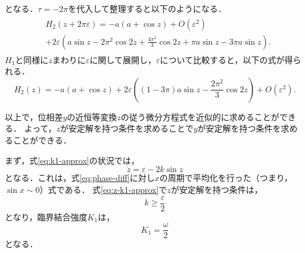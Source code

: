 \documentclass[../main]{subfiles}
\begin{document}
    となる．$\tau=-2\pi$を代入して整理すると以下のようになる．
    \begin{align}
        \begin{split}
            &H_2(z+2\pi\varepsilon )=-a(a+\cos z)+O(\varepsilon^2)\\
            &+2\varepsilon\left( a\sin z-2\pi^2\cos2 z+\frac{4\pi^2}{3} \cos 2 z+\pi a\sin z-3\pi a\sin z\right).
        \end{split}
    \end{align}
    $H_1$と同様に$z$まわりに$\varepsilon$に関して展開し，$\varepsilon$について比較すると，以下の式が得られる．
    \begin{equation}
        \label{eq:nit-H2}
        H_2(z)=-a(a+\cos z)+2\varepsilon\left( (1-3\pi)a\sin z-\frac{2\pi^2}{3} \cos 2 z\right)+O(\varepsilon^2).
    \end{equation}

    以上で，位相差$y$の近恒等変換$z$の従う微分方程式を近似的に求めることができる．
    よって，$z$が安定解を持つ条件を求めることで$y$が安定解を持つ条件を求めることができる．
    
    まず，式\eqref{eq:k1-approx}の状況では，
    \begin{equation}
        \dot{z}=\varepsilon-2k\sin z
        \label{eq:z-k1-approx}
    \end{equation}
    となる．これは，式\eqref{eq:phase-diff}に対し$x$の周期で平均化を行った（つまり，$\sin x\sim 0$）式である．
    式\eqref{eq:z-k1-approx}で$z$が安定解を持つ条件は，
    \begin{equation}
        k\geq\frac{\varepsilon}{2}
    \end{equation}
    となり，臨界結合強度$K_1$は，
    \begin{equation}
        \label{eq:K1-approx}
        K_1=\frac{\omega}{2}
    \end{equation}
    となる．
\end{document}
